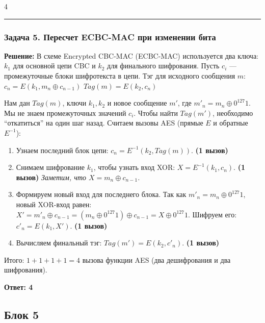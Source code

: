 ﻿\documentclass[8pt,a4paper,landscape]{extarticle}
\newcommand{\tightlist}{}
\begin{document}
\begin{multicols*}{4}
\begin{center}\rule{0.5\linewidth}{0.5pt}\end{center}

\subsubsection{Задача 5. Пересчет ECBC-MAC при изменении бита}\label{ux437ux430ux434ux430ux447ux430-5.-ux43fux435ux440ux435ux441ux447ux435ux442-ecbc-mac-ux43fux440ux438-ux438ux437ux43cux435ux43dux435ux43dux438ux438-ux431ux438ux442ux430}

\textbf{Решение:} В схеме Encrypted CBC-MAC (ECBC-MAC) используется два ключа: \(k_1\) для основной цепи CBC и \(k_2\) для финального шифрования. Пусть \(c_{i}\) --- промежуточные блоки шифротекста в цепи. Тэг для исходного сообщения \(m\): \(c_n = E(k_1, m_n \oplus c_{n-1})\) \(Tag(m) = E(k_2, c_n)\)

Нам дан \(Tag(m)\), ключи \(k_1, k_2\) и новое сообщение \(m'\), где \(m'_n = m_n \oplus 0^{127}1\). Мы не знаем промежуточных значений \(c_i\). Чтобы найти \(Tag(m')\), необходимо ``откатиться'' на один шаг назад. Считаем вызовы AES (прямые \(E\) и обратные \(E^{-1}\)):

\begin{enumerate}
\def\labelenumi{\arabic{enumi}.}
\tightlist
\item
  Узнаем последний блок цепи: \(c_n = E^{-1}(k_2, Tag(m))\). \textbf{(1 вызов)}
\item
  Снимаем шифрование \(k_1\), чтобы узнать вход XOR: \(X = E^{-1}(k_1, c_n)\). \textbf{(1 вызов)} \emph{Заметим, что \(X = m_n \oplus c_{n-1}\).}
\item
  Формируем новый вход для последнего блока. Так как \(m'_n = m_n \oplus 0^{127}1\), новый XOR-вход равен: \(X' = m'_n \oplus c_{n-1} = (m_n \oplus 0^{127}1) \oplus c_{n-1} = X \oplus 0^{127}1\). Шифруем его: \(c'_n = E(k_1, X')\). \textbf{(1 вызов)}
\item
  Вычисляем финальный тэг: \(Tag(m') = E(k_2, c'_n)\). \textbf{(1 вызов)}
\end{enumerate}

Итого: \(1 + 1 + 1 + 1 = 4\) вызова функции AES (два дешифрования и два шифрования).

\textbf{Ответ: 4}

\subsection{Блок 5}\label{ux431ux43bux43eux43a-5}


\end{multicols*}
\end{document}
